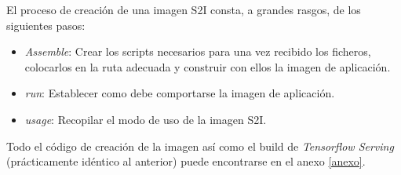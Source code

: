 El proceso de creación de una imagen S2I consta, a grandes rasgos, de los siguientes pasos: 

\begin{itemize}
\item \textit{Assemble}: Crear los scripts necesarios para una vez recibido los ficheros, colocarlos en la ruta adecuada y construir con ellos la imagen de aplicación. 
\item \textit{run}: Establecer como debe comportarse la imagen de aplicación.
\item \textit{usage}: Recopilar el modo de uso de la imagen S2I. 

\end{itemize}

Todo el código de creación de la imagen así como el build de \textit{Tensorflow Serving} (prácticamente idéntico al anterior) puede encontrarse en el anexo \ref{anexo}.



